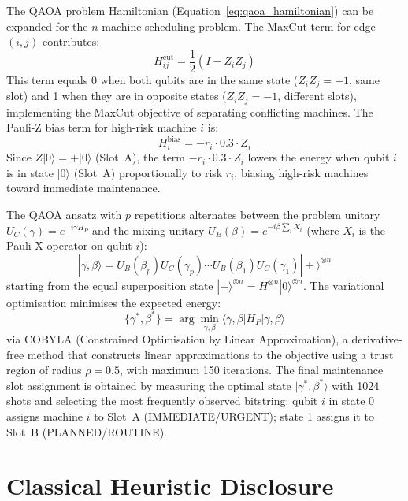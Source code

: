 The QAOA problem Hamiltonian (Equation~\ref{eq:qaoa_hamiltonian}) can be expanded for the $n$-machine scheduling problem. The MaxCut term for edge $(i,j)$ contributes:
\begin{equation}
    H_{ij}^{\text{cut}} = \frac{1}{2}(I - Z_i Z_j)
    \label{eq:maxcut_term}
\end{equation}
This term equals 0 when both qubits are in the same state ($Z_i Z_j = +1$, same slot) and 1 when they are in opposite states ($Z_i Z_j = -1$, different slots), implementing the MaxCut objective of separating conflicting machines. The Pauli-Z bias term for high-risk machine $i$ is:
\begin{equation}
    H_i^{\text{bias}} = -r_i \cdot 0.3 \cdot Z_i
    \label{eq:bias_term}
\end{equation}
Since $Z|0\rangle = +|0\rangle$ (Slot~A), the term $-r_i \cdot 0.3 \cdot Z_i$ lowers the energy when qubit $i$ is in state $|0\rangle$ (Slot~A) proportionally to risk $r_i$, biasing high-risk machines toward immediate maintenance.

The QAOA ansatz with $p$ repetitions alternates between the problem unitary $U_C(\gamma) = e^{-i\gamma H_P}$ and the mixing unitary $U_B(\beta) = e^{-i\beta \sum_i X_i}$ (where $X_i$ is the Pauli-X operator on qubit $i$):
\begin{equation}
    |\gamma, \beta\rangle = U_B(\beta_p) U_C(\gamma_p) \cdots U_B(\beta_1) U_C(\gamma_1) |+\rangle^{\otimes n}
    \label{eq:qaoa_state}
\end{equation}
starting from the equal superposition state $|+\rangle^{\otimes n} = H^{\otimes n}|0\rangle^{\otimes n}$. The variational optimisation minimises the expected energy:
\begin{equation}
    \{\gamma^*, \beta^*\} = \arg\min_{\gamma,\beta} \langle \gamma, \beta | H_P | \gamma, \beta \rangle
    \label{eq:qaoa_opt}
\end{equation}
via COBYLA (Constrained Optimisation by Linear Approximation), a derivative-free method that constructs linear approximations to the objective using a trust region of radius $\rho = 0.5$, with maximum 150 iterations. The final maintenance slot assignment is obtained by measuring the optimal state $|\gamma^*, \beta^*\rangle$ with 1024 shots and selecting the most frequently observed bitstring: qubit $i$ in state 0 assigns machine $i$ to Slot~A (IMMEDIATE/URGENT); state 1 assigns it to Slot~B (PLANNED/ROUTINE).


\section{Classical Heuristic Disclosure}

